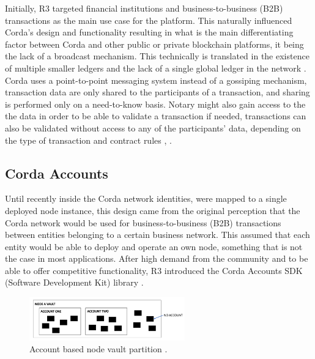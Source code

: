 Initially, R3 targeted financial institutions and business-to-business (B2B) transactions as the main use case for the platform. This naturally influenced Corda's design and functionality resulting in what is the main differentiating factor between Corda and other public or private blockchain platforms, it being the lack of a broadcast mechanism. This technically is translated in the existence of multiple smaller ledgers and the lack of a single global ledger in the network \cite{corda-network}. Corda uses a point-to-point messaging system instead of a gossiping mechanism, transaction data are only shared to the participants of a transaction, and sharing is performed only on a need-to-know basis. Notary might also gain access to the the data in order to be able to validate a transaction if needed, transactions can also be validated without access to any of the participants' data, depending on the type of transaction and contract rules \cite{corda-ledger}, \cite{corda-contracts}.

\subsection{Corda Accounts} \label{ssec:corda-accounts}

Until recently inside the Corda network identities, were mapped to a single deployed node instance, this design came from the original perception that the Corda network would be used for business-to-business (B2B) transactions between entities belonging to a certain business network. This assumed that each entity would be able to deploy and operate an own node, something that is not the case in most applications. After high demand from the community and to be able to offer competitive functionality, R3 introduced the Corda Accounts SDK (Software Development Kit) library \cite{corda-accounts-announcement} \cite{corda-accounts-library}.

\begin{figure}[ht]
	\centering
	\captionsetup{width=.8\linewidth}
	\includegraphics[width=0.6\textwidth]{figs/ch3/accounts-node}
	\caption{Account based node vault partition \cite{corda-accounts-library}.}
	\label{fig:accounts-node}
\end{figure} 

